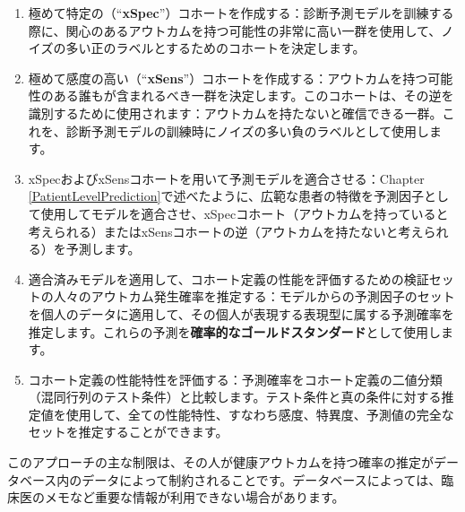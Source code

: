 \documentclass[
  11pt]{book}
\providecommand{\tightlist}{%
  \setlength{\itemsep}{0pt}\setlength{\parskip}{0pt}}
\theoremstyle{definition}
\theoremstyle{definition}
\theoremstyle{definition}
\theoremstyle{definition}
\theoremstyle{remark}
\begin{document}
\begin{enumerate}
\def\labelenumi{\arabic{enumi}.}
\tightlist
\item
  極めて特定の（``\textbf{xSpec}''）コホートを作成する：診断予測モデルを訓練する際に、関心のあるアウトカムを持つ可能性の非常に高い一群を使用して、ノイズの多い正のラベルとするためのコホートを決定します。
\item
  極めて感度の高い（``\textbf{xSens}''）コホートを作成する：アウトカムを持つ可能性のある誰もが含まれるべき一群を決定します。このコホートは、その逆を識別するために使用されます：アウトカムを持たないと確信できる一群。これを、診断予測モデルの訓練時にノイズの多い負のラベルとして使用します。
\item
  xSpecおよびxSensコホートを用いて予測モデルを適合させる：Chapter \ref{PatientLevelPrediction}で述べたように、広範な患者の特徴を予測因子として使用してモデルを適合させ、xSpecコホート（アウトカムを持っていると考えられる）またはxSensコホートの逆（アウトカムを持たないと考えられる）を予測します。
\item
  適合済みモデルを適用して、コホート定義の性能を評価するための検証セットの人々のアウトカム発生確率を推定する：モデルからの予測因子のセットを個人のデータに適用して、その個人が表現する表現型に属する予測確率を推定します。これらの予測を\textbf{確率的なゴールドスタンダード}として使用します。
\item
  コホート定義の性能特性を評価する：予測確率をコホート定義の二値分類（混同行列のテスト条件）と比較します。テスト条件と真の条件に対する推定値を使用して、全ての性能特性、すなわち感度、特異度、予測値の完全なセットを推定することができます。
\end{enumerate}

このアプローチの主な制限は、その人が健康アウトカムを持つ確率の推定がデータベース内のデータによって制約されることです。データベースによっては、臨床医のメモなど重要な情報が利用できない場合があります。
\end{document}
